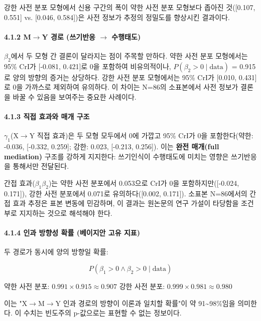 \documentclass[a4paper,10pt]{oblivoir}
\begin{document}
강한 사전 분포 모형에서 신용 구간의 폭이 약한 사전 분포 모형보다 좁아진 것([0.107, 0.551] vs. [0.046, 0.584])은 사전 정보가 추정의 정밀도를 향상시킨 결과이다.

\paragraph{4.1.2 M\ensuremath{\rightarrow}Y 경로 (쓰기반응 \ensuremath{\rightarrow} 수행태도)}

$\beta_2$에서 두 모형 간 결론이 달라지는 점이 주목할 만하다. 약한 사전 분포 모형에서는 95\% CrI가 [-0.081, 0.421]로 0을 포함하여 비유의적이나, $P(\beta_2 > 0 \mid \text{data})$ = 0.915로 양의 방향의 증거는 상당하다. 강한 사전 분포 모형에서는 95\% CrI가 [0.010, 0.431]로 0을 가까스로 제외하여 유의하다. 이 차이는 N=86의 소표본에서 사전 정보가 결론을 바꿀 수 있음을 보여주는 중요한 사례이다.

\paragraph{4.1.3 직접 효과와 매개 구조}

$\gamma_1$(X\ensuremath{\rightarrow}Y 직접 효과)은 두 모형 모두에서 0에 가깝고 95\% CrI가 0을 포함한다(약한: -0.036, [-0.332, 0.259]; 강한: 0.023, [-0.213, 0.256]). 이는 \textbf{완전 매개(full mediation)} 구조를 강하게 지지한다: 쓰기인식이 수행태도에 미치는 영향은 쓰기반응을 통해서만 전달된다.

간접 효과($\beta_1\beta_2$)는 약한 사전 분포에서 0.053으로 CrI가 0을 포함하지만([-0.024, 0.171]), 강한 사전 분포에서 0.071로 유의하다([0.002, 0.171]). 소표본 N=86에서의 간접 효과 추정은 표본 변동에 민감하며, 이 결과는 원논문의 연구 가설이 타당함을 조건부로 지지하는 것으로 해석해야 한다.

\paragraph{4.1.4 인과 방향성 확률 (베이지안 고유 지표)}

두 경로가 동시에 양의 방향일 확률:

\[ P(\beta_1 > 0 \wedge \beta_2 > 0 \mid \text{data}) \]

약한 사전 분포: $0.991 \times 0.915 \approx 0.907$
강한 사전 분포: $0.999 \times 0.981 \approx 0.980$

이는 "X\ensuremath{\rightarrow}M\ensuremath{\rightarrow}Y 인과 경로의 방향이 이론과 일치할 확률"이 약 91\~{}98\%임을 의미한다. 이 수치는 빈도주의 p-값으로는 표현할 수 없는 정보이다.
\end{document}
